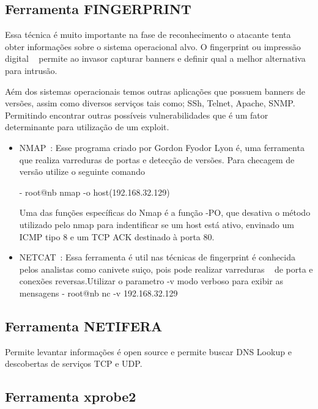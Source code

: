 \subsection {Ferramenta FINGERPRINT}

Essa técnica é muito importante na fase de reconhecimento o atacante tenta obter informações sobre o sistema operacional alvo. O fingerprint ou impressão digital ~\cite{giavaroto} permite ao invasor capturar banners e definir qual a melhor alternativa para intrusão. 

Aém dos sistemas operacionais temos outras aplicações que possuem banners de versões, assim como diversos serviços tais como; SSh, Telnet, Apache, SNMP. Permitindo encontrar outras possíveis vulnerabilidades que é um fator determinante para utilização de um exploit.


\begin{itemize}

\item NMAP~\cite{giavaroto}: Esse programa criado por Gordon Fyodor Lyon é, uma ferramenta  que realiza varreduras de portas e detecção de versões. Para checagem de versão utilize o seguinte comando

- root@nb nmap -o host(192.168.32.129)

Uma das funções específicas do Nmap é a função -PO, que desativa o método utilizado pelo nmap para indentificar se um host está ativo, envinado um ICMP tipo 8 e um TCP ACK destinado à porta 80.

\item NETCAT~\cite{giavaroto}: Essa ferramenta é util nas técnicas de fingerprint é conhecida pelos analistas como canivete suiço, pois pode realizar varreduras ~\cite{greg} de porta e conexões reversas.Utilizar o parametro -v modo verboso para exibir as mensagens
- root@nb nc -v 192.168.32.129


\end{itemize}



\subsection {Ferramenta NETIFERA}


Permite levantar informações é open source e permite buscar DNS Lookup e descobertas de serviços TCP e UDP.

\subsection {Ferramenta xprobe2}



